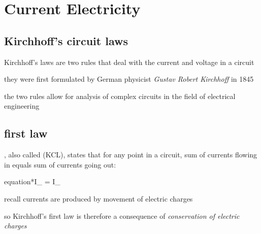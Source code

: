 \section{Current Electricity}




\subsection{Kirchhoff's circuit laws}

Kirchhoff's laws are two rules that deal with the current and voltage in a circuit

they were first formulated by German physicist \emph{Gustav Robert Kirchhoff} in 1845

the two rules allow for analysis of complex circuits in the field of electrical engineering

\subsection{first law}

\begin{ilight}
	, also called  (KCL), states that for any point in a circuit, sum of currents flowing in equals sum of currents going out: \begin{empheq}[box=\tcbhighmath]{equation*}{\sum I_ = \sum I_}\end{empheq}
\end{ilight}

\cmt recall currents are produced by movement of electric charges

so Kirchhoff's first law is therefore a consequence of \emph{conservation of electric charges}

\begin{marginfigure}
	\vspace{-21pt}
	\begin{center}
	\end{center}
	\vspace{-20pt}
\end{marginfigure}

